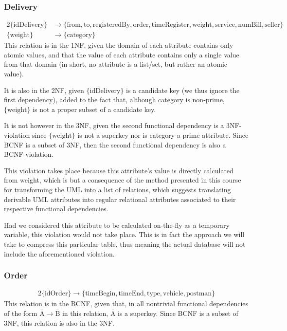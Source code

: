 \documentclass{report}[a4paper]
\theoremstyle{remark}
\begin{document}
\subsubsection{Delivery}
\begin{alignat*}{2}
    \{\text{idDelivery}\} &\rightarrow \{\text{from},\text{to},\text{registeredBy},\text{order},\text{timeRegister},\text{weight},\text{service},\text{numBill},\text{seller}\} \\
    \{\text{weight}\} &\rightarrow \{\text{category}\}
\end{alignat*}
This relation is in the 1NF, given the domain of each attribute contains only atomic values, and that the value of each attribute contains only a single value from that domain (in short, no attribute is a list/set, but rather an atomic value).\par
It is also in the 2NF, given $\{\text{idDelivery}\}$ is a candidate key (we thus ignore the first dependency), added to the fact that, although category is non-prime, $\{\text{weight}\}$ is not a proper subset of a candidate key. \par
It is not however in the 3NF, given the second functional dependency is a 3NF-violation since $\{\text{weight}\}$ is not a superkey nor is category a prime attribute. Since BCNF is a subset of 3NF, then the second functional dependency is also a BCNF-violation.\par
This violation takes place because this attribute's value is directly calculated from weight, which is but a consequence of the method presented in this course for transforming the UML into a list of relations, which suggests translating derivable UML attributes into regular relational attributes associated to their respective functional dependencies. \par
Had we considered this attribute to be calculated on-the-fly as a temporary variable, this violation would not take place. This is in fact the approach we will take to compress this particular table, thus meaning the actual database will not include the aforementioned violation.
\subsubsection{Order}
\begin{alignat*}{2}
    \{\text{idOrder}\} \rightarrow \{\text{timeBegin},\text{timeEnd},\text{type},\text{vehicle},\text{postman}\}
\end{alignat*}
This relation is in the BCNF, given that, in all nontrivial functional dependencies of the form $\overline{\text{A}} \rightarrow \overline{\text{B}}$ in this relation, $\overline{\text{A}}$ is a superkey. Since BCNF is a subset of 3NF, this relation is also in the 3NF.
\end{document}
